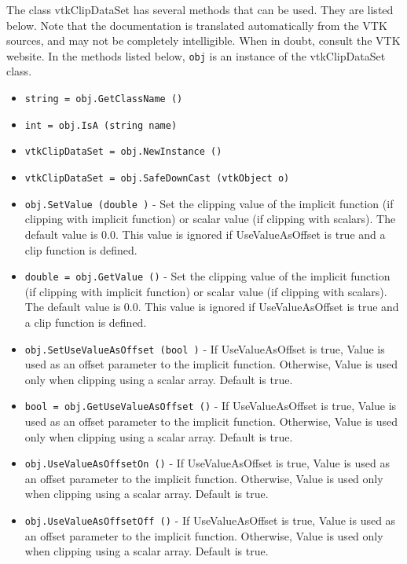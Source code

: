 The class vtkClipDataSet has several methods that can be used.
  They are listed below.
Note that the documentation is translated automatically from the VTK sources,
and may not be completely intelligible.  When in doubt, consult the VTK website.
In the methods listed below, \verb|obj| is an instance of the vtkClipDataSet class.
\begin{itemize}
\item  \verb|string = obj.GetClassName ()|

\item  \verb|int = obj.IsA (string name)|

\item  \verb|vtkClipDataSet = obj.NewInstance ()|

\item  \verb|vtkClipDataSet = obj.SafeDownCast (vtkObject o)|

\item  \verb|obj.SetValue (double )| -  Set the clipping value of the implicit function (if clipping with
 implicit function) or scalar value (if clipping with
 scalars). The default value is 0.0. This value is ignored if
 UseValueAsOffset is true and a clip function is defined.

\item  \verb|double = obj.GetValue ()| -  Set the clipping value of the implicit function (if clipping with
 implicit function) or scalar value (if clipping with
 scalars). The default value is 0.0. This value is ignored if
 UseValueAsOffset is true and a clip function is defined.

\item  \verb|obj.SetUseValueAsOffset (bool )| -  If UseValueAsOffset is true, Value is used as an offset parameter to
 the implicit function. Otherwise, Value is used only when clipping
 using a scalar array. Default is true.

\item  \verb|bool = obj.GetUseValueAsOffset ()| -  If UseValueAsOffset is true, Value is used as an offset parameter to
 the implicit function. Otherwise, Value is used only when clipping
 using a scalar array. Default is true.

\item  \verb|obj.UseValueAsOffsetOn ()| -  If UseValueAsOffset is true, Value is used as an offset parameter to
 the implicit function. Otherwise, Value is used only when clipping
 using a scalar array. Default is true.

\item  \verb|obj.UseValueAsOffsetOff ()| -  If UseValueAsOffset is true, Value is used as an offset parameter to
 the implicit function. Otherwise, Value is used only when clipping
 using a scalar array. Default is true.


\end{itemize}
